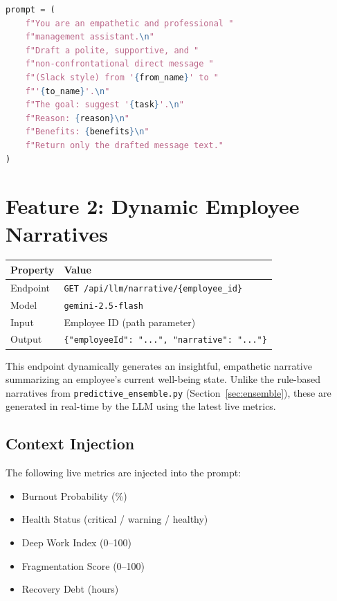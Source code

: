 \documentclass[12pt, a4paper, oneside]{report}
\begin{document}
\begin{lstlisting}[language=Python, caption={Message drafting prompt structure}]
prompt = (
    f"You are an empathetic and professional "
    f"management assistant.\n"
    f"Draft a polite, supportive, and "
    f"non-confrontational direct message "
    f"(Slack style) from '{from_name}' to "
    f"'{to_name}'.\n"
    f"The goal: suggest '{task}'.\n"
    f"Reason: {reason}\n"
    f"Benefits: {benefits}\n"
    f"Return only the drafted message text."
)
\end{lstlisting}

\section{Feature 2: Dynamic Employee Narratives}
\label{sec:llm-narrative}

\begin{table}[H]
\centering
\begin{tabular}{@{} l l @{}}
\toprule
\textbf{Property} & \textbf{Value} \\
\midrule
Endpoint     & \texttt{GET /api/llm/narrative/\{employee\_id\}} \\
Model        & \texttt{gemini-2.5-flash} \\
Input        & Employee ID (path parameter) \\
Output       & \texttt{\{"employeeId": "...", "narrative": "..."\}} \\
\bottomrule
\end{tabular}
\end{table}

This endpoint dynamically generates an insightful, empathetic narrative summarizing an employee's current well-being state. Unlike the rule-based narratives from \texttt{predictive\_ensemble.py} (Section~\ref{sec:ensemble}), these are generated in real-time by the LLM using the latest live metrics.

\subsection{Context Injection}

The following live metrics are injected into the prompt:
\begin{itemize}
    \item Burnout Probability (\%)
    \item Health Status (critical / warning / healthy)
    \item Deep Work Index (0--100)
    \item Fragmentation Score (0--100)
    \item Recovery Debt (hours)
\end{itemize}
\end{document}
